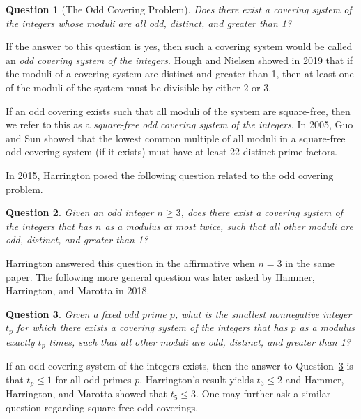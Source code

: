 \documentclass[10pt,a4paper]{amsart}
\newtheorem{question}{Question}
\begin{document}
\begin{question}[The Odd Covering Problem]
Does there exist a covering system of the integers whose moduli are all odd, distinct, and greater than 1?
\end{question}

If the answer to this question is yes, then such a covering system would be called an \emph{odd covering system of the integers}.  Hough and Nielsen \cite{hn} showed in 2019 that if the moduli of a covering system are distinct and greater than 1, then at least one of the moduli of the system must be divisible by either $2$ or $3$.  

If an odd covering exists such that all moduli of the system are square-free, then we refer to this as a \emph{square-free odd covering system of the integers}.  In 2005, Guo and Sun \cite{gs} showed that the lowest common multiple of all moduli in a square-free odd covering system (if it exists) must have at least 22 distinct prime factors.%

In 2015, Harrington \cite{h} posed the following question related to the odd covering problem.

\begin{question}
Given an odd integer $n\geq 3$, does there exist a covering system of the integers that has $n$ as a modulus at most twice, such that all other moduli are odd, distinct, and greater than 1?
\end{question}

Harrington answered this question in the affirmative when $n=3$ in the same paper.  The following more general question was later asked by Hammer, Harrington, and Marotta \cite{hhm} in 2018.

\begin{question}\label{question:mainquestion}
Given a fixed odd prime $p$, what is the smallest nonnegative integer $t_p$ for which there exists a covering system of the integers that has $p$ as a modulus exactly $t_p$ times, such that all other moduli are odd, distinct, and greater than 1?
\end{question}

If an odd covering system of the integers exists, then the answer to Question~\ref{question:mainquestion} is that $t_p\leq 1$ for all odd primes $p$.  Harrington's result yields $t_3\leq 2$ and Hammer, Harrington, and Marotta showed that $t_5\leq 3$.  One may further ask a similar question regarding square-free odd coverings.
\end{document}
